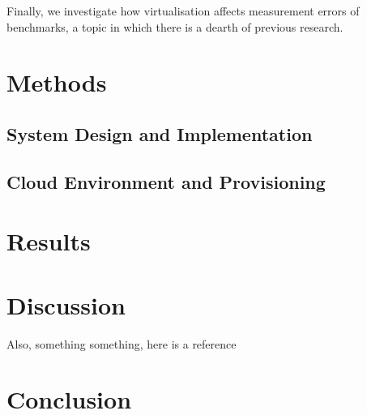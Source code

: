 \documentclass{article}
\begin{document}
\begin{multicols}{2}
Finally, we investigate how virtualisation affects measurement errors of
benchmarks, a topic in which there is a dearth of previous research.

\section*{Methods}

\fixme{\lipsum[100]}

\subsection*{System Design and Implementation}

\subsection*{Cloud Environment and Provisioning}

\section*{Results}

\fixme{\lipsum[100]}

\section*{Discussion}

\fixme{\lipsum[66]}

Also, something something, here is a reference~\cite{mell_nist_nodate}

\section*{Conclusion}

\fixme{\lipsum[100]}

\printbibliography

\end{multicols}
\end{document}
